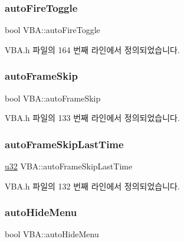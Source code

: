\subsubsection{\texorpdfstring{auto\+Fire\+Toggle}{autoFireToggle}}
{\footnotesize\ttfamily bool V\+B\+A\+::auto\+Fire\+Toggle}



V\+B\+A.\+h 파일의 164 번째 라인에서 정의되었습니다.

\mbox{\label{class_v_b_a_a9ecbee7d82db73b24aee3afb66128388}} 
\subsubsection{\texorpdfstring{auto\+Frame\+Skip}{autoFrameSkip}}
{\footnotesize\ttfamily bool V\+B\+A\+::auto\+Frame\+Skip}



V\+B\+A.\+h 파일의 133 번째 라인에서 정의되었습니다.

\mbox{\label{class_v_b_a_ad50caab57b4ddb20bf511fe1a8c46024}} 
\subsubsection{\texorpdfstring{auto\+Frame\+Skip\+Last\+Time}{autoFrameSkipLastTime}}
{\footnotesize\ttfamily \mbox{\hyperlink{_system_8h_a10e94b422ef0c20dcdec20d31a1f5049}{u32}} V\+B\+A\+::auto\+Frame\+Skip\+Last\+Time}



V\+B\+A.\+h 파일의 132 번째 라인에서 정의되었습니다.

\mbox{\label{class_v_b_a_a19362d5508f73c0f93f307eef61d6915}} 
\subsubsection{\texorpdfstring{auto\+Hide\+Menu}{autoHideMenu}}
{\footnotesize\ttfamily bool V\+B\+A\+::auto\+Hide\+Menu}



